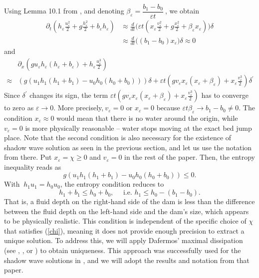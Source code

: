 \documentclass{article}
\theoremstyle{plain}
\theoremstyle{definition}
\theoremstyle{remark}
\begin{document}
Using Lemma 10.1 from \cite{MN2010}, and denoting
\( \beta_{\varepsilon} = \dfrac{b_{1} - b_{0}}{\varepsilon t}\ \), we
obtain
\[\begin{split}
\partial_{t}\left( h_{\varepsilon}\frac{u_{\varepsilon}^{2}}{2} 
+ g\frac{h_{\varepsilon}^{2}}{2} + b_{\varepsilon}h_{\varepsilon} \right) 
& \approx \frac{d}{dt}\Big(\varepsilon t\left( x_{\varepsilon}\frac{v_{\varepsilon}^{2}}{2} 
+ g\frac{x_{\varepsilon}^{2}}{2} + \beta_{\varepsilon}x_{\varepsilon} \right)\Big)
\delta\\
& \approx \frac{d}{dt}\big((b_1-b_0)x_\varepsilon\big)\delta 
\approx 0
\end{split}
\]
and 
\[ 
\begin{split} 
& \partial_{x}\left( gu_{\varepsilon}h_{\varepsilon}
\left( h_{\varepsilon} + b_{\varepsilon} \right) 
+ h_{\varepsilon}\frac{u_{\varepsilon}^{3}}{2} \right) \\
\approx & \left( g\left( u_{1}h_{1}\left( h_{1} + b_{1} \right) 
- u_{0}h_{0}\left( h_{0} + b_{0} \right) \right) \right)\delta 
+ \varepsilon t(gv_{\varepsilon}x_{\varepsilon}\left( x_{\varepsilon} 
+ \beta_{\varepsilon} \right) 
+ x_{\varepsilon}\frac{v_{\varepsilon}^{3}}{2})\delta^{'}
\end{split} 
\]
Since \(\delta^{'}\) changes its sign, the term
\(\varepsilon t\left(gv_{\varepsilon}x_{\varepsilon}
\left( x_{\varepsilon} + \beta_{\varepsilon} \right) 
+ x_{\varepsilon}\frac{v_{\varepsilon}^{3}}{2}\right)\)
has to converge to zero as \(\varepsilon \rightarrow 0\). More
precisely,\(\ v_{\varepsilon} = 0\) or \(x_{\varepsilon} = 0\) because
\(\varepsilon t\beta_{\varepsilon} \rightarrow b_{1} - b_{0} \neq 0\).
The condition \(x_{\varepsilon} \approx 0 \) would mean that there is no water around the origin, 
while \(v_{\varepsilon} = 0\) is more 
physically reasonable 
-- water stops moving at the exact bed jump place.
Note that the second condition is also necessary for the existence
of shadow wave solution as seen in the previous section, and let us use 
the notation from there.
Put  \(x_{\varepsilon} = \chi \geq 0\) and \(v_{\varepsilon} = 0\) 
in the rest of the paper. 
Then, the entropy inequality reads as
\[ g\left( u_{1}h_{1}\left( h_{1} + b_{1} \right) 
- u_{0}h_{0}\left( h_{0} + b_{0} \right) \right) \leq 0.\]
With \(\ h_{1}u_{1} = h_{0}u_{0}\), the entropy condition reduces to
\begin{equation} \label{ent}
h_{1} + b_{1} \leq h_{0} + b_{0}, \quad \text{ i.e. } h_{1} \leq h_{0} - \left( b_{1} - b_{0} \right).
\end{equation}
That is, a fluid depth on the right-hand side of the dam is less
than the difference between the fluid depth on the left-hand side
and the dam's size, which appears to be physically realistic.
This condition is independent of the specific choice of $\chi$
that satisfies (\ref{chi}), meaning it does
not provide enough precision to extract a unique solution.
To address this, we will apply Dafermos'  maximal dissipation  
(see \cite{D1973}, \cite{D2012}, or \cite{F2014})
to obtain uniqueness. This approach was successfully used
for the shadow wave solutions in \cite{NR2022},
and we will adopt the results and notation from that paper.
\end{document}
